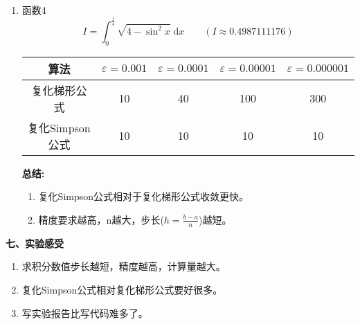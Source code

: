 \documentclass[a4paper,11pt]{article}
\begin{document}
\begin{enumerate}
\begin{enumerate}[(1)]
\begin{center}
\begin{tabular}{|c|c|c|c|c|}
					\hline
				\end{tabular}
			\end{center}
		\item 函数4
			\begin{displaymath}
				I=\int_{0}^{\frac{1}{4}}\sqrt{4-\sin^{2}{x}}\;\mathrm{d}x\qquad(I\approx{}0.4987111176)
			\end{displaymath}
			\begin{center}
				\begin{tabular}{|c|c|c|c|c|}
					\hline
					算法 & $\varepsilon=0.001$ & $\varepsilon=0.0001$  & $\varepsilon=0.00001$ & $\varepsilon=0.000001$ \\
					\hline 
					复化梯形公式 & 10 & 40 & 100 & 300\\
					\hline
					复化Simpson公式 & 10 & 10 & 10 & 10\\
					\hline
				\end{tabular}
			\end{center}
		\textbf{总结:}
			\begin{enumerate}[1)]
				\item 复化Simpson公式相对于复化梯形公式收敛更快。
				\item 精度要求越高，n越大，步长($h=\frac{b-a}{n}$)越短。
			\end{enumerate}
	\end{enumerate}
\end{enumerate}
\begin{Large}
	\textbf{七、实验感受}
\end{Large}
\begin{enumerate}
	\item 求积分数值步长越短，精度越高，计算量越大。
	\item 复化Simpson公式相对复化梯形公式要好很多。
	\item 写实验报告比写代码难多了。
\end{enumerate}
\end{document}
